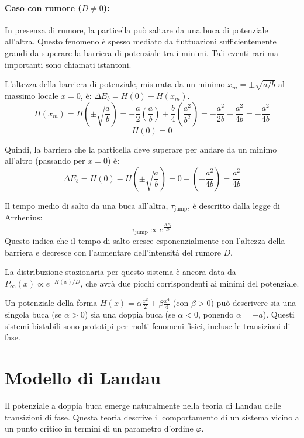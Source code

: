 \paragraph{Caso con rumore ($D \ne 0$):}

In presenza di rumore, la particella può saltare da una buca di potenziale all'altra. Questo fenomeno è spesso mediato da fluttuazioni sufficientemente grandi da superare la barriera di potenziale tra i minimi. Tali eventi rari ma importanti sono chiamati istantoni.


L'altezza della barriera di potenziale, misurata da un minimo $x_m = \pm\sqrt{a/b}$ al massimo locale $x=0$, è: $\Delta E_b = H(0) - H(x_m)$.
\begin{equation*}
H(x_m) = H\left(\pm\sqrt{\frac{a}{b}}\right) = -\frac{a}{2}\left(\frac{a}{b}\right)+\frac{b}{4}\left(\frac{a^2}{b^2}\right) = -\frac{a^2}{2b}+\frac{a^2}{4b} = -\frac{a^2}{4b}
\end{equation*}
\begin{equation*}
H(0) = 0
\end{equation*}

Quindi, la barriera che la particella deve superare per andare da un minimo all'altro (passando per $x=0$) è:
\begin{equation}
\Delta E_b = H(0) - H\left(\pm\sqrt{\frac{a}{b}}\right) = 0 - \left(-\frac{a^2}{4b}\right) = \frac{a^2}{4b}
\end{equation}

Il tempo medio di salto da una buca all'altra, $\tau_{\text{jump}}$, è descritto dalla legge di Arrhenius:
\begin{equation}
\tau_{\text{jump}} \propto e^{\frac{\Delta E_b}{D}}
\end{equation}
Questo indica che il tempo di salto cresce esponenzialmente con l'altezza della barriera e decresce con l'aumentare dell'intensità del rumore $D$.

La distribuzione stazionaria per questo sistema è ancora data da $P_\infty(x) \propto e^{-H(x)/D}$, che avrà due picchi corrispondenti ai minimi del potenziale. 

Un potenziale della forma $H(x)=\alpha\frac{x^{2}}{2}+\beta\frac{x^{4}}{4}$ (con $\beta>0$) può descrivere sia una singola buca (se $\alpha>0$) sia una doppia buca (se $\alpha<0$, ponendo $\alpha = -a$). Questi sistemi bistabili sono prototipi per molti fenomeni fisici, incluse le transizioni di fase.

\section{Modello di Landau}
Il potenziale a doppia buca emerge naturalmente nella teoria di Landau delle transizioni di fase. Questa teoria descrive il comportamento di un sistema vicino a un punto critico in termini di un parametro d'ordine $\varphi$.

